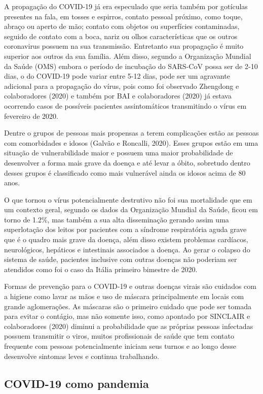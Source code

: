 A propagação do COVID-19 já era especulado que seria também por gotículas presentes na fala, em tosses e espirros, contato pessoal próximo, como toque, abraço ou aperto de mão; contato com objetos ou superfícies contaminadas, seguido de contato com a boca, nariz ou olhos características que os outros coronavirus possuem na sua transmissão. Entretanto sua propagação é muito superior aos outros da sua família. Além disso, segundo a Organização Mundial da Saúde (OMS) embora o período de incubação do SARS-CoV possa ser de 2-10 dias, o do COVID-19 pode variar entre 5-12 dias, pode ser um agravante adicional para a propagação do vírus, pois como foi observado Zhengdong e colaboradores (2020) e também por BAI e colaboradores (2020) já estava ocorrendo casos de possíveis pacientes assintomáticos transmitindo o vírus em fevereiro de 2020.

Dentre o grupos de pessoas mais propensas a terem complicações estão as pessoas com comorbidades e idosos (Galvão e Roncalli, 2020). Esses grupos estão em uma situação de vulnerabilidade maior e possuem uma maior probabilidade de desenvolver a forma mais grave da doença e até levar a óbito, sobretudo dentro desses grupos é classificado como mais vulnerável ainda os idosos acima de 80 anos.

O que tornou o vírus potencialmente destrutivo não foi sua mortalidade que em um contexto geral, segundo os dados da Organização Mundial da Saúde, ficou em torno de 1.2\%, mas também a sua alta disseminação gerando assim uma superlotação dos leitos por pacientes com a síndrome respiratória aguda grave que é o quadro mais grave da doença, além disso existem problemas cardíacos, neurológicos, hepáticos e intestinais associados a doença. Ao gerar o colapso do sistema de saúde, pacientes inclusive com outras doenças não poderiam ser atendidos como foi o caso da Itália primeiro bimestre de 2020.

Formas de prevenção para o COVID-19 e outras doenças virais são cuidados com a higiene como lavar as mãos e uso de máscara principalmente em locais com grande aglomerações. As máscaras são o primeiro cuidado que pode ser tomada para evitar o contágio, mas não somente isso, como apontado por SINCLAIR e colaboradores (2020) diminui a probabilidade que as próprias pessoas infectadas possuem transmitir o viros, muitos profissionais de saúde que tem contato frequente com pessoas potencialmente iniciam seus turnos e ao longo desse desenvolve sintomas leves e continua trabalhando.    

\subsection{COVID-19 como pandemia}

